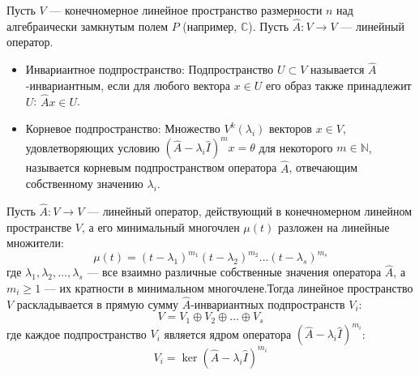 \documentclass[14pt]{extreport}
\begin{document}
    \begin{defbox}
        Пусть $V$ — конечномерное линейное пространство размерности $n$ над алгебраически замкнутым полем $P$ (например, $\mathbb{C}$). Пусть $\hat{A}: V \to V$ — линейный оператор.
        \begin{itemize}
            \item Инвариантное подпространство: Подпространство $U \subset V$ называется $\hat{A}$-инвариантным, если для любого вектора $x \in U$ его образ также принадлежит $U$: $\hat{A}x \in U$.
            \item Корневое подпространство: Множество $V^k(\lambda_i)$ векторов $x \in V$, удовлетворяющих условию $(\hat{A} - \lambda_i \hat{I})^{m} x = \theta$ для некоторого $m \in \mathbb{N}$, называется корневым подпространством оператора $\hat{A}$, отвечающим собственному значению $\lambda_i$.
        \end{itemize}
    \end{defbox}

    \begin{thbox}
        Пусть $\hat{A}: V \to V$ — линейный оператор, действующий в конечномерном линейном пространстве $V$, а его минимальный многочлен $\mu(t)$ разложен на линейные множители:$$\mu(t) = (t - \lambda_1)^{m_1} (t - \lambda_2)^{m_2} \dots (t - \lambda_s)^{m_s}$$где $\lambda_1, \lambda_2, \dots, \lambda_s$ — все взаимно различные собственные значения оператора $\hat{A}$, а $m_i \ge 1$ — их кратности в минимальном многочлене.Тогда линейное пространство $V$ раскладывается в прямую сумму $\hat{A}$-инвариантных подпространств $V_i$:$$V = V_1 \oplus V_2 \oplus \dots \oplus V_s$$где каждое подпространство $V_i$ является ядром оператора $(\hat{A} - \lambda_i \hat{I})^{m_i}$:$$V_i = \ker(\hat{A} - \lambda_i \hat{I})^{m_i}$$
    \end{thbox}
\end{document}
